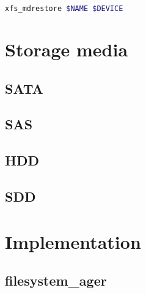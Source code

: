 \documentclass[
  color, %
  table, %
  lof,   %
  lot,   %
]{fithesis3}
\begin{document}
\begin{lstlisting}[language=bash]
  xfs_mdrestore $NAME $DEVICE
\end{lstlisting}

\chapter{Storage media}
\section{SATA}
\section{SAS}
\section{HDD}
\section{SDD}
\chapter{Implementation}
\section{filesystem\_ager}


\end{document}
